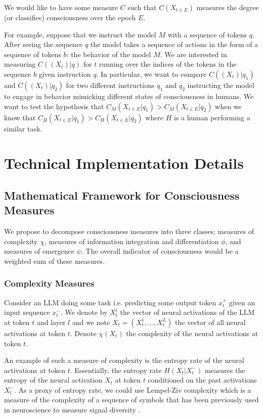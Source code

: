 \documentclass[11pt,a4paper]{article}
\begin{document}
We would like to have some measure $C$ such that $C(X_{t\in E})$ measures the degree (or classifies) consciousness over the epoch $E$.

For example, suppose that we instruct the model $M$ with a sequence of tokens $q$. After seeing the sequence $q$ the model takes a sequence of actions in the form of a sequence of tokens $b$: the behavior of the model $M$. We are interested in measuring $C((X_t)|q)$ for $t$ running over the indices of the tokens in the sequence $b$ given instruction $q$. In particular, we want to compare $C((X_t)|q_1)$ and $C((X_t)|q_2)$ for two different instructions $q_1$ and $q_2$ instructing the model to engage in behavior mimicking different states of consciousness in humans. We want to test the hypothesis that $C_M(X_{t\in E}|q_1) > C_M(X_{t\in E}|q_2)$ when we know that $C_H(X_{t\in E}|q_1) > C_H(X_{t\in E}|q_2)$ where $H$ is a human performing a similar task.

\section{Technical Implementation Details}

\subsection{Mathematical Framework for Consciousness Measures}

We propose to decompose consciousness measures into three classes: measures of complexity $\chi$, measures of information integration and differentiation $\phi$, and measures of emergence $\psi$. The overall indicator of consciousness would be a weighted sum of these measures.

\subsubsection{Complexity Measures}

Consider an LLM doing some task i.e. predicting some output token $x_t^+$ given an input sequence $x_t^-$. We denote by $X_t^l$ the vector of neural activations of the LLM at token $t$ and layer $l$ and we note $X_t = (X_t^1, \ldots, X_t^L)$ the vector of all neural activations at token $t$. Denote $\chi(X_t)$ the complexity of the neural activations at token $t$. 

An example of such a measure of complexity is the entropy rate of the neural activations at token $t$. Essentially, the entropy rate $H(X_t | X_t^-)$ measures the entropy of the neural activation $X_t$ at token $t$ conditioned on the past activations $X_t^-$. As a proxy of entropy rate, we could use Lempel-Ziv complexity which is a measure of the complexity of a sequence of symbols that has been previously used in neuroscience to measure signal diversity \citep{Schartner2015}.
\end{document}

